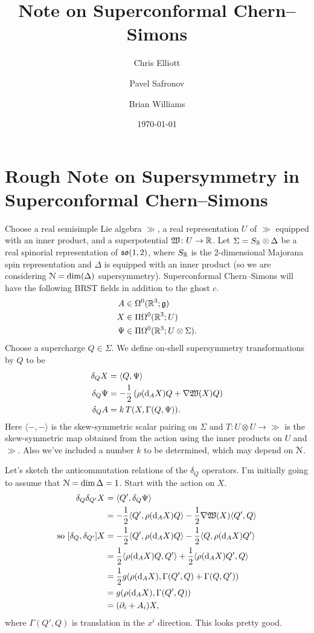 \documentclass[10pt, oneside]{article}
\title{Note on Superconformal Chern--Simons}
\author{Chris Elliott\and Pavel Safronov \and Brian Williams}
\date{\today}
\begin{document}
 
\section*{Rough Note on Supersymmetry in Superconformal Chern--Simons}
Choose a real semisimple Lie algebra $\gg$, a real representation $U$ of $\gg$ equipped with an inner product, and a superpotential $\mathfrak{W} \colon U \to \mathbb R$.  Let $\Sigma = S_\mathbb R \otimes \Delta$ be a real spinorial representation of $\mathfrak{so}(1,2)$, where $S_\mathbb R$ is the 2-dimensional Majorana spin representation and $\Delta$ is equipped with an inner product (so we are considering $\mathcal{N} = \dim(\Delta)$ supersymmetry).  Superconformal Chern--Simons will have the following BRST fields in addition to the ghost $c$.
\begin{align*}
A &\in \Omega^0(\mathbb R^3; \mathfrak{g}) \\
X &\in \Pi \Omega^0(\mathbb R^3; U) \\
\Psi &\in \Pi \Omega^0(\mathbb R^3; U \otimes \Sigma).
\end{align*}
Choose a supercharge $Q \in \Sigma$.  We define on-shell supersymmetry transformations by $Q$ to be
\begin{align*}
\delta_Q X &=  \langle Q, \Psi \rangle\\
\delta_Q \Psi &= -\frac 12\left(\rho({\rm d}_A X)Q + \nabla\mathfrak{W}(X)Q\right)\\
\delta_Q A &= k\, T(X, \Gamma( Q, \Psi )).
\end{align*}
Here $\langle - , - \rangle$ is the skew-symmetric scalar pairing on $\Sigma$ and $T \colon U \otimes U \to \gg$ is the skew-symmetric map obtained from the action using the inner products on $U$ and $\gg$.  Also we've included a number $k$ to be determined, which may depend on $\mathcal{N}$.  

Let's sketch the anticommutation relations of the $\delta_Q$ operators.  I'm initially going to assume that $\mathcal{N}=\dim \Delta = 1$.  Start with the action on $X$.
\begin{align*}
\delta_{Q} \delta_{Q'}X &= \langle Q', \delta_{Q}\Psi \rangle \\
&= - \frac 12 \langle Q', \rho({\rm d}_A X)Q \rangle - \frac 12 \nabla\mathfrak{W}(X) \langle Q', Q \rangle \\
\text{so } [\delta_Q, \delta_{Q'}]X &= - \frac 12\langle Q', \rho({\rm d}_A X)Q\rangle - \frac 12\langle Q, \rho({\rm d}_A X)Q'\rangle \\
&= \frac 12\langle \rho({\rm d}_A X)Q, Q'\rangle + \frac 12\langle \rho({\rm d}_A X)Q', Q\rangle \\
&= \frac 12g(\rho({\rm d}_A X), \Gamma(Q',Q) + \Gamma(Q,Q')) \\
&=  g(\rho({\rm d}_A X), \Gamma(Q',Q)) \\
&= (\partial_i + A_i)X,
\end{align*}
where $\Gamma(Q',Q)$ is translation in the $x^i$ direction.  This looks pretty good.
\end{document}
